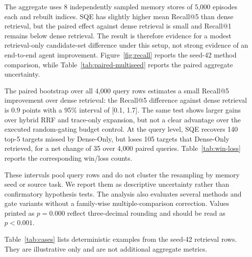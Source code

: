 \documentclass[10pt]{article}
\begin{document}
The aggregate uses 8 independently sampled memory stores of 5,000 episodes each and rebuilt
indices. SQE has slightly higher mean Recall@5 than dense retrieval, but the
paired effect against dense retrieval is small and Recall@1 remains below dense
retrieval. The result is therefore evidence for a modest retrieval-only
candidate-set difference under this setup, not strong evidence of an end-to-end
agent improvement. Figure~\ref{fig:recall} reports the
seed-42 method comparison, while Table~\ref{tab:paired-multiseed} reports the
paired aggregate uncertainty.

\begin{table}[!tbp]
\caption{Paired bootstrap tests over all independent memory-index seeds.}
\label{tab:paired-multiseed}
\centering
\scriptsize

\end{table}

The paired bootstrap over all 4,000 query rows estimates a
small Recall@5 improvement over dense retrieval: the Recall@5 difference against dense retrieval is 0.9 points with a 95\% interval of [0.1, 1.7]. The
same test shows larger gains over hybrid RRF and trace-only expansion, but not
a clear advantage over the executed random-gating budget control.
At the query level, SQE recovers 140 top-5 targets missed by Dense-Only, but loses 105 targets that Dense-Only retrieved, for a net change of 35 over 4,000 paired queries. Table~\ref{tab:win-loss} reports the corresponding
win/loss counts.

These intervals pool query rows and do not cluster the resampling by memory seed
or source task. We report them as descriptive uncertainty rather than confirmatory
hypothesis tests. The analysis also evaluates several methods and gate variants
without a family-wise multiple-comparison correction. Values printed as
$p=0.000$ reflect three-decimal rounding and should be read as $p<0.001$.

\begin{table}[!tbp]
\caption{Query-level top-5 wins and losses for SQE against Dense-Only.}
\label{tab:win-loss}
\centering
\small

\end{table}

Table~\ref{tab:cases} lists deterministic examples from the seed-42 retrieval
rows. They are illustrative only and are not additional aggregate metrics.

\begin{table}[!tbp]
\caption{Seed-42 examples where SQE and Dense-Only differ at top-5.}
\label{tab:cases}
\centering
\scriptsize
\resizebox{\linewidth}{!}{}
\end{table}
\end{document}
